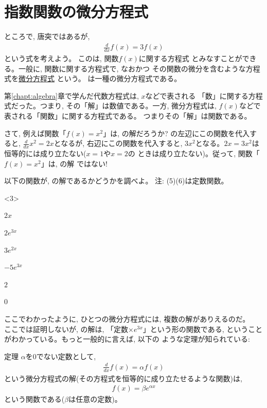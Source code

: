 \section{指数関数の微分方程式}\label{sect_diffeq_exp}

ところで, 唐突ではあるが, 
\begin{eqnarray}
\frac{d}{dx}f(x)=3f(x)\label{eq:exp_diffeq_sol00}
\end{eqnarray}
という式を考えよう。
このは, 関数$f(x)$に関する方程式
とみなすことができる。一般に, 関数に関する方程式で, なおかつ
その関数の微分を含むような方程式を\underline{微分方程式}
という。
は一種の微分方程式である。

第\ref{chapt:algebra}章で学んだ代数方程式は, $x$などで表される
「数」に関する方程式だった。つまり, その「解」は数値である。一方, 
微分方程式は, $f(x)$などで表される「関数」に関する方程式である。
つまりその「解」は関数である。

さて, 例えば関数「$f(x)=x^2$」は, の解だろうか? 
の左辺にこの関数を代入すると, 
$\frac{d}{dx}x^2=2x$となるが, 右辺にこの関数を代入すると, 
$3x^2$となる。$2x=3x^2$は恒等的には成り立たない($x=1$や$x=2$の
ときは成り立たない)。従って, 関数「$f(x)=x^2$」は, の解
ではない!

\begin{q}\label{q:exp_diffeq_sol00} 
以下の関数が, の解であるかどうかを調べよ。
注: (5)(6)は定数関数。
\begin{edaenumerate}<3>
\item $2x$
\item $2e^{3x}$
\item $3e^{2x}$
\item $-5e^{3x}$
\item $2$
\item $0$
\end{edaenumerate}
\end{q}

ここでわかったように, ひとつの微分方程式には, 複数の解がありえるのだ。\\

ここでは証明しないが, の解は, 
「定数×$e^{3x}$」という形の関数である, ということがわかっている。もっと一般的に言えば, 以下の
ような定理が知られている:
\begin{itembox}{定理}
$\alpha$を0でない定数として, 
\begin{eqnarray}
\frac{d}{dx}f(x)=\alpha f(x)\label{eq:diffeq0}
\end{eqnarray}
という微分方程式の解(その方程式を恒等的に成り立たせるような関数)は, 
\begin{eqnarray}
f(x)=\beta e^{\alpha x}\label{eq:diffeq000}
\end{eqnarray}
という関数である($\beta$は任意の定数)。
\end{itembox}

